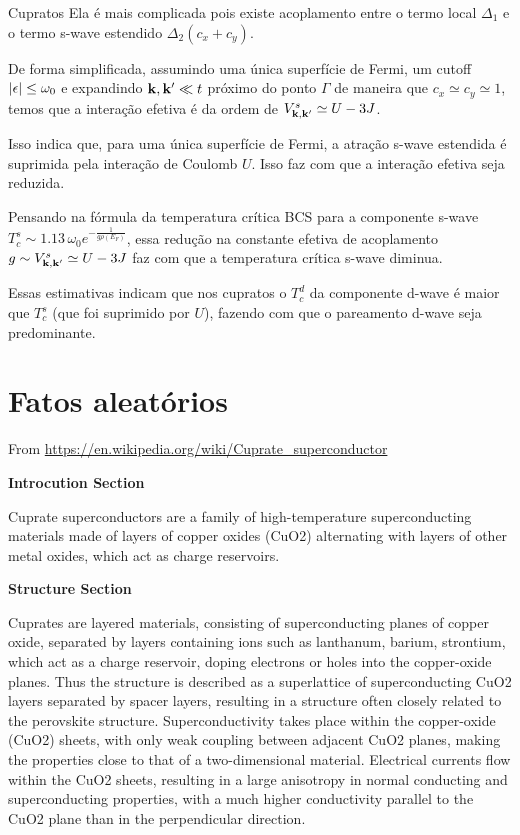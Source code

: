 \documentclass[a4paper,10pt]{article}
\begin{document}
\begin{section}{Cupratos}
Ela é mais complicada pois existe acoplamento entre o termo local $\Delta_1$ e o termo s-wave estendido $\Delta_2 (c_x + c_y)$.

\n

De forma simplificada, assumindo uma única superfície de Fermi, um cutoff $\abs{\epsilon} \leq \omega_0$ e expandindo $\vb{k}, \vb{k}' \ll t$ próximo do ponto $\Gamma$ de maneira que $c_x \simeq c_y \simeq 1$, temos que a interação efetiva é da ordem de $V_{\vb{k},\vb{k}'}^s \simeq U - 3J$.
\n

Isso indica que, para uma única superfície de Fermi, a atração s-wave estendida é suprimida pela interação de Coulomb $U$. Isso faz com que a interação efetiva seja reduzida.

\n

Pensando na fórmula da temperatura crítica BCS para a componente s-wave $T_c^s \sim 1.13 \, \omega_0 e^{-\frac{1}{g \rho(E_F)}}$, essa redução na constante efetiva de acoplamento $g \sim V_{\vb{k},\vb{k}'}^s \simeq U-3J$ faz com que a temperatura crítica s-wave diminua.

\n

Essas estimativas indicam que nos cupratos o $T_c^d$ da componente d-wave é maior que $T_c^s$ (que foi suprimido por $U$), fazendo com que o pareamento d-wave seja predominante.

\end{section}


\pagebreak


\section{Fatos aleatórios}

From \url{https://en.wikipedia.org/wiki/Cuprate_superconductor}

\textbf{Introcution Section}

Cuprate superconductors are a family of high-temperature superconducting materials made of layers of copper oxides (CuO2) alternating with layers of other metal oxides, which act as charge reservoirs.

\textbf{Structure Section}

Cuprates are layered materials, consisting of superconducting planes of copper oxide, separated by layers containing ions such as lanthanum, barium, strontium, which act as a charge reservoir, doping electrons or holes into the copper-oxide planes. Thus the structure is described as a superlattice of superconducting CuO2 layers separated by spacer layers, resulting in a structure often closely related to the perovskite structure. Superconductivity takes place within the copper-oxide (CuO2) sheets, with only weak coupling between adjacent CuO2 planes, making the properties close to that of a two-dimensional material. Electrical currents flow within the CuO2 sheets, resulting in a large anisotropy in normal conducting and superconducting properties, with a much higher conductivity parallel to the CuO2 plane than in the perpendicular direction.
\end{document}
